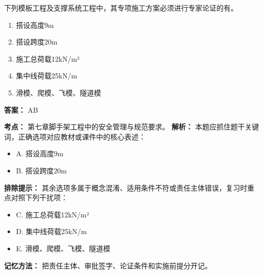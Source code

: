 \documentclass[UTF8,fontset=fandol,11pt]{ctexart}
\begin{document}
\begin{quizbox}[title={第 4 题}]
下列模板工程及支撑系统工程中，其专项施工方案必须进行专家论证的有。\\
\begin{enumerate}[label=\Alph*.]
\item 搭设高度9m
\item 搭设跨度20m
\item 施工总荷载12kN/m²
\item 集中线荷载25kN/m
\item 滑模、爬模、飞模、隧道模
\end{enumerate}
\textbf{答案：} AB
\vspace{0.25em}
\begin{answerbox}[title={考点解析}]
\textbf{考点：} 第七章脚手架工程中的安全管理与规范要求。
\textbf{解析：} 本题应抓住题干关键词，正确选项对应教材或课件中的核心表述：
\begin{itemize}
\item A. 搭设高度9m
\item B. 搭设跨度20m
\end{itemize}
\textbf{排除提示：} 其余选项多属于概念混淆、适用条件不符或责任主体错误，复习时重点对照下列干扰项：
\begin{itemize}
\item C. 施工总荷载12kN/m²
\item D. 集中线荷载25kN/m
\item E. 滑模、爬模、飞模、隧道模
\end{itemize}
\textbf{记忆方法：} 把责任主体、审批签字、论证条件和实施前提分开记。
\end{answerbox}
\end{quizbox}
\end{document}
